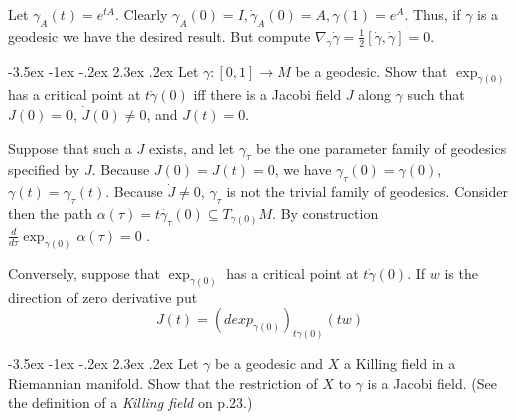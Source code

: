 \documentclass[10pt]{article}
\makeatletter
\renewcommand\section{\@startsection{section}{1}{\z@}%
                                  {-3.5ex \@plus -1ex \@minus -.2ex}%
                                  {2.3ex \@plus.2ex}%
                                  {\normalfont\large\bfseries}}
\DeclareMathOperator{\2}{II}
\makeatother
\begin{document}
Let $\gamma_A(t) = e^{tA}$. Clearly $\gamma_A(0) = I, \dot{\gamma}_A(0) = A, \gamma(1) = e^A$. Thus, if $\gamma$ is a geodesic we have the desired result. But compute $\nabla_{\dot{\gamma}}  \dot{\gamma} = \frac{1}{2}[\dot{\gamma}, \dot{\gamma}] =0.$

\section{Let $\gamma :[0,1] \to M$ be a geodesic. Show that $\exp_{\gamma(0)}$ has a critical point at $t \dot{\gamma}(0)$ iff there is a Jacobi field $J$ along $\gamma$ such that $J(0) = 0$, $\dot{J}(0) \neq 0$, and $J(t) =0$.}

Suppose that such a $J$ exists, and let $\gamma_\tau$ be the one parameter family of geodesics specified by $J$. Because $J(0)= J(t) = 0$, we have $\gamma_\tau (0) = \gamma(0)$, $\gamma(t) = \gamma_\tau(t)$. Because $\dot{J} \neq 0$, $\gamma_\tau$ is not the trivial family of geodesics. Consider then  the path $\alpha(\tau)  = t \dot{\gamma_\tau}(0) \subseteq T_{\gamma(0)}M$. By construction $ \frac{d}{d \tau} \exp_{\gamma(0)} \alpha(\tau) =0$ .

Conversely, suppose that $\exp_{\gamma(0)}$ has a critical point at $t \dot{\gamma}(0)$. If $w$ is the direction of zero derivative put
\[J(t) = ( d exp_{\gamma(0)})_{t \dot{\gamma}(0)}(tw)\]

\section{Let $\gamma$ be a geodesic and $X$ a Killing field in a Riemannian manifold. Show that the restriction of $X$ to $\gamma$ is a Jacobi field. (See the definition of a \emph{Killing field} on p.23.)}
\end{document}

